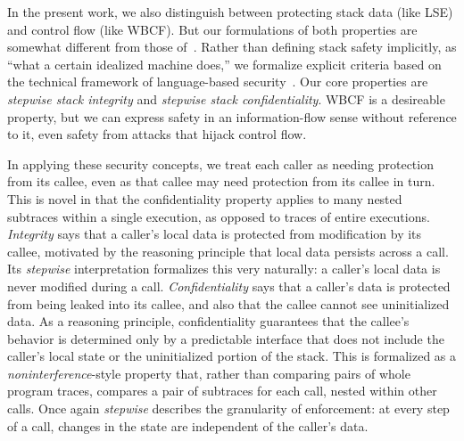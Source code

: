 \documentclass[acmsmall,review,anonymous]{acmart}\settopmatter{printfolios=true,printccs=false,printacmref=false}
\begin{document}
In the present work, we also distinguish between protecting stack data (like
LSE) and
control flow (like WBCF).  But our formulations of both properties are
somewhat different from those of~\cite{Skorstengaard+19}.  Rather than
defining stack safety implicitly,
as ``what a certain idealized machine does,'' we formalize explicit criteria
based on the technical framework of language-based
security\ifaftersubmission~\citep{??}\fi.
Our core properties are \emph{stepwise stack integrity} and
\emph{stepwise stack confidentiality}.  WBCF is a desireable property, but
we can express safety in an information-flow sense without reference to it,
even safety from attacks that hijack control flow.  

In applying these security concepts, we treat each caller as needing protection
from its callee, even as that callee may need protection from its callee in turn.
This is novel in that the
confidentiality property applies to many nested subtraces within a single execution,
as opposed to traces of entire executions.
{\em Integrity} says that a caller's local data is protected from modification by its callee,
motivated by the reasoning principle that local data persists across a call. Its
{\em stepwise} interpretation formalizes this very naturally: a caller's local data
is never modified during a call. {\em Confidentiality} says that a caller's data is protected
from being leaked into its callee, and also that the callee cannot see uninitialized data.
As a reasoning principle, confidentiality guarantees that the callee's
behavior is determined only by a predictable interface that does not include the caller's
local state or the uninitialized portion of the stack. This is formalized as a
{\em noninterference}-style property that, rather than comparing pairs of whole program traces,
compares a pair of subtraces for each call, nested within other calls. Once again
{\em stepwise} describes the granularity of enforcement: at every step of a call,
changes in the state are independent of the caller's data.
\end{document}
